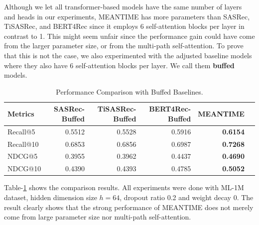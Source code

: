 Although we let all transformer-based models have the same number of layers and heads in our experiments, MEANTIME has more parameters than SASRec, TiSASRec, and BERT4Rec since it employs 6 self-attention blocks per layer in contrast to 1. This might seem unfair since the performance gain could have come from the larger parameter size, or from the multi-path self-attention. To prove that this is not the case, we also experimented with the adjusted baseline models where they also have 6 self-attention blocks per layer. We call them \textbf{buffed} models. 

\begin{table}[h]
\caption{Performance Comparison with Buffed Baselines.}
\label{tab:buff_results}
\begin{tabular}{@{}lrrrrr@{}}
\toprule
{Metrics} & {SASRec-Buffed}& {TiSASRec-Buffed} & {BERT4Rec-Buffed} & {MEANTIME}      \\ \midrule
{Recall@5}  & {0.5512} & {0.5528} & {0.5916} & {\textbf{0.6154}} \\
{Recall@10}  & {0.6853} & {0.6856} & {0.6987} & {\textbf{0.7268}} \\
{NDCG@5}   & {0.3955} & {0.3962}  & {0.4437} & {\textbf{0.4690}} \\
{NDCG@10}  & {0.4390} & {0.4393}  & {0.4785} & {\textbf{0.5052}} \\ \bottomrule
\end{tabular}
\end{table}

Table-\ref{tab:buff_results} shows the comparison results. All experiments were done with ML-1M dataset, hidden dimension size $h=64$, dropout ratio 0.2 and weight decay 0. The result clearly shows that the strong performance of MEANTIME does not merely come from large parameter size nor multi-path self-attention.